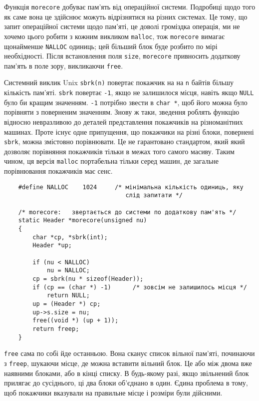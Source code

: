 \documentclass[a4paper,12pt]{book}
\begin{document}
  Функція \texttt{morecore} добуває пам'ять від операційної системи. Подробиці щодо того
  як саме вона це здійснює можуть відрізнятися на різних системах. Це тому, що запит
  операційної системи щодо пам'яті, це доволі громіздка операція, ми не хочемо цього
  робити з кожним викликом \texttt{malloc}, тож \texttt{morecore} вимагає щонайменше
  \texttt{NALLOC} одиниць; цей більший блок буде розбито по мірі необхідності. Після
  встановлення поля \texttt{size}, \texttt{morecore} привносить додаткову пам'ять в поле
  зору, викликаючи \texttt{free}.

  Системний виклик Unix \texttt{sbrk(n)} повертає покажчик на на \texttt{n} байтів
  більшу кількість пам'яті. \texttt{sbrk} повертає \texttt{-1}, якщо не залишилося місця,
  навіть якщо \texttt{NULL} було би кращим значенням. \texttt{-1} потрібно звести в
  \texttt{char *}, щоб його можна було порівняти з поверненим значенням. Знову ж таки,
  зведення роблять функцію відносно невразливою до деталей представлення покажчиків на
  різноманітних машинах. Проте існує одне припущення, що покажчики на різні блоки,
  повернені \texttt{sbrk}, можна змістовно порівнювати. Це не гарантовано стандартом, який
  який дозволяє порівняння покажчиків тільки в межах того самого масиву. Таким чином, ця
  версія \texttt{malloc} портабельна тільки серед машин, де загальне порівнювання
  покажчиків має сенс.

  \begin{verbatim}
    #define NALLOC    1024     /* мінімальна кількість одиниць, яку
                                  слід запитати */

    /* morecore:   звертається до системи по додаткову пам'ять */
    static Header *morecore(unsigned nu)
    {
        char *cp, *sbrk(int);
        Header *up;

        if (nu < NALLOC)
            nu = NALLOC;
        cp = sbrk(nu * sizeof(Header));
        if (cp == (char *) -1)      /* зовсім не залишилось місця */
            return NULL;
        up = (Header *) cp;
        up->s.size = nu;
        free((void *) (up + 1));
        return freep;
    }
  \end{verbatim}

  \texttt{free} сама по собі йде останньою. Вона сканує список вільної пам'яті, починаючи з
  \texttt{freep}, шукаючи місце, де можна вставити вільний блок. Це або між двома вже
  наявними блоками, або в кінці списку. В будь-якому разі, якщо звільнений блок прилягає
  до сусіднього, ці два блоки об'єднано в один. Єдина проблема в тому, щоб покажчики
  вказували на правильне місце і розміри були дійсними.
\end{document}
